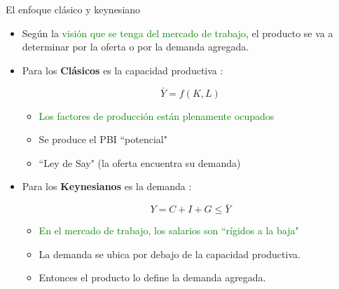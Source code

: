 \documentclass{beamer}
\begin{document}
\begin{frame}{El enfoque clásico y keynesiano}

    \begin{itemize}
        \item Según la \textcolor{green}{visión que se tenga del mercado de trabajo}, el producto se va a determinar por la oferta o por la demanda agregada. 
        \item Para los \textbf{Clásicos} es la capacidad productiva \faCogs:
            \begin{center}
            \begin{tcolorbox}[width=2in, boxsep=0pt, left=0pt, right=0pt, top=2pt, ,colframe = blue!70!black, colback = blue!7!white ]%
                    $$ \bar{Y}=f(K, L) $$
             \end{tcolorbox}
             \end{center}
             
            \begin{itemize}
            \item \textcolor{green}{Los factores de producción están plenamente ocupados}
            \item Se produce el PBI ``potencial"
              \item ``Ley de Say" (la oferta encuentra su demanda)
            \end{itemize}
            
        \vspace{2mm}
        \item Para los \textbf{Keynesianos} es la demanda \faCartPlus:
            
            \begin{center}
            \begin{tcolorbox}[width=2in, boxsep=0pt, left=0pt, right=0pt, top=2pt, ,colframe = blue!70!black, colback = blue!7!white]%
                    $$ Y = C + I + G  \leq \bar{Y} $$
             \end{tcolorbox}
             \end{center}
             
            \begin{itemize}
            \item  \textcolor{green}{En el mercado de trabajo, los salarios son ``rígidos a la baja"}
            \item La demanda se ubica por debajo de la capacidad productiva. 
            \item Entonces el producto lo define la demanda agregada.
            \end{itemize}
    \end{itemize}

\end{frame}
\end{document}
